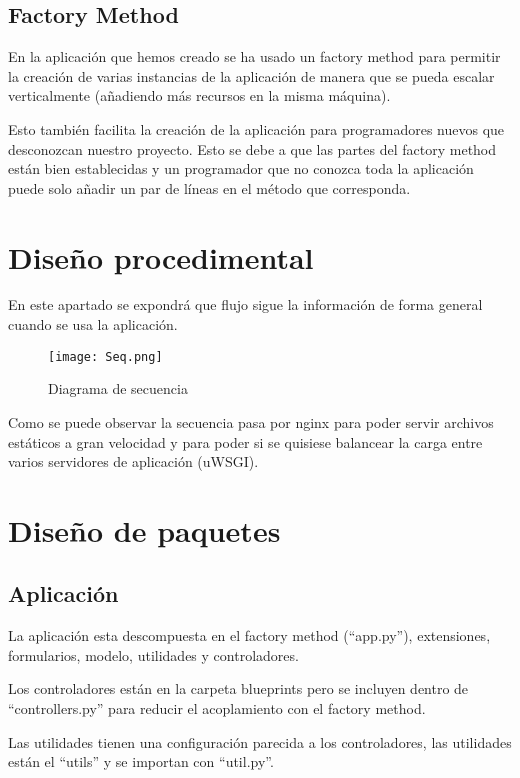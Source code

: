 \subsection{Factory Method}

En la aplicación que hemos creado se ha usado un factory method para permitir la creación de varias instancias de la aplicación de manera que se pueda escalar verticalmente (añadiendo más recursos en la misma máquina).

Esto también facilita la creación de la aplicación para programadores nuevos que desconozcan nuestro proyecto. Esto se debe a que las partes del factory method están bien establecidas y un programador que no conozca toda la aplicación puede solo añadir un par de líneas en el método que corresponda.


\section{Diseño procedimental}
En este apartado se expondrá que flujo sigue la información de forma general cuando se usa la aplicación.


\begin{figure}
	\centering
	\texttt{[image: Seq.png]}
	\caption{Diagrama de secuencia}\label{fig:Seq.png}
\end{figure}

Como se puede observar la secuencia pasa por nginx para poder servir archivos estáticos a gran velocidad y para poder si se quisiese balancear la carga entre varios servidores de aplicación (uWSGI).


\section{Diseño de paquetes}


\subsection{Aplicación}
La aplicación esta descompuesta en el factory method (``app.py''), extensiones, formularios, modelo, utilidades y controladores.

Los controladores están en la carpeta blueprints pero se incluyen dentro de ``controllers.py'' para reducir el acoplamiento con el factory method.

Las utilidades tienen una configuración parecida a los controladores, las utilidades están el ``utils'' y se importan con ``util.py''.


